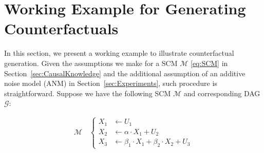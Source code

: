 %
\label{Appendix}

\section{Working Example for Generating Counterfactuals}
\label{Appendix.WorkingExampleAAP}

In this section, we present a working example to illustrate counterfactual generation. 
Given the assumptions we make for a SCM $\mathcal{M}$ \eqref{eq:SCM} in Section~\ref{sec:CausalKnowledge} and the additional assumption of an additive noise model (ANM) in Section~\ref{sec:Experiments}, such procedure is straightforward.
Suppose we have the following SCM $\mathcal{M}$ and corresponding DAG $\mathcal{G}$:

%
\begin{minipage}{.45\linewidth}
\begin{figure}[H]
\centering
\end{figure}
\end{minipage}
\begin{minipage}{.45\linewidth}
\begin{align*}
\mathcal{M} \, & 
\begin{cases}
    X_1 & \leftarrow U_1 \\
    X_2 & \leftarrow \alpha \cdot X_1  + U_2 \\
    X_3 & \leftarrow \beta_1 \cdot X_1 + \beta_2 \cdot X_2 + U_3
\end{cases}
\end{align*}
\end{minipage}
%

\medskip

